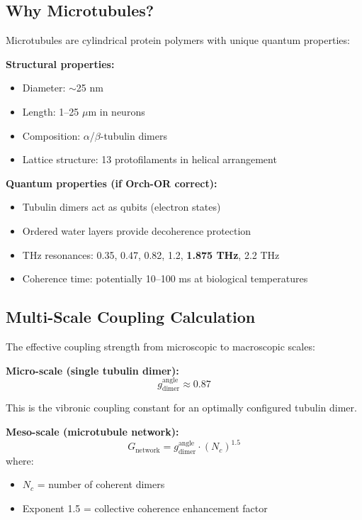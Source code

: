 \subsection{Why Microtubules?}

Microtubules are cylindrical protein polymers with unique quantum properties:

\textbf{Structural properties:}
\begin{itemize}
\item Diameter: $\sim$25 nm
\item Length: 1--25 $\mu$m in neurons
\item Composition: $\alpha$/$\beta$-tubulin dimers
\item Lattice structure: 13 protofilaments in helical arrangement
\end{itemize}

\textbf{Quantum properties (if Orch-OR correct):}
\begin{itemize}
\item Tubulin dimers act as qubits (electron states)
\item Ordered water layers provide decoherence protection
\item THz resonances: 0.35, 0.47, 0.82, 1.2, \textbf{1.875 THz}, 2.2 THz
\item Coherence time: potentially 10--100 ms at biological temperatures
\end{itemize}

\subsection{Multi-Scale Coupling Calculation}

The effective coupling strength from microscopic to macroscopic scales:

\textbf{Micro-scale (single tubulin dimer):}
\begin{equation}
g_{\text{dimer}}^{\text{angle}} \approx 0.87
\end{equation}

This is the vibronic coupling constant for an optimally configured tubulin dimer.

\textbf{Meso-scale (microtubule network):}
\begin{equation}
G_{\text{network}} = g_{\text{dimer}}^{\text{angle}} \cdot (N_c)^{1.5}
\end{equation}
where:
\begin{itemize}
\item $N_c$ = number of coherent dimers
\item Exponent 1.5 = collective coherence enhancement factor
\end{itemize}

